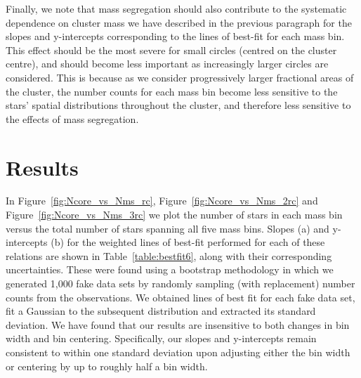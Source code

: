 Finally, we note that mass segregation
should also contribute to the systematic dependence on cluster mass we
have described in the previous paragraph for the slopes and
y-intercepts corresponding to the 
lines of best-fit for each mass bin.  This effect should be the most
severe for small circles (centred on the cluster centre), and should
become less important as increasingly larger circles are considered.
This is because as we consider progressively larger fractional areas
of the cluster, the number counts for each mass bin become less
sensitive to the stars' spatial distributions throughout the cluster,
and therefore less sensitive to the effects of mass segregation.

\section{Results} \label{results6}

In Figure~\ref{fig:Ncore_vs_Nms_rc}, Figure~\ref{fig:Ncore_vs_Nms_2rc}
and Figure~\ref{fig:Ncore_vs_Nms_3rc} we plot the number of
stars in each mass bin versus the total number of stars spanning all five
mass bins.  Slopes (a) and y-intercepts (b) for the weighted lines of best-fit
performed for each of these relations are shown in Table~\ref{table:bestfit6},
along with their corresponding uncertainties.  These were 
found using a bootstrap methodology in which we generated 1,000 fake
data sets by randomly sampling (with replacement) number counts from
the observations.  We obtained lines of best fit for each fake data
set, fit a Gaussian to the subsequent distribution and extracted its
standard deviation.  We have found that our results are insensitive to
both changes in bin width and bin centering.  Specifically, our slopes
and y-intercepts remain consistent to within one standard deviation
upon adjusting either the bin width or centering by up to roughly half
a bin width.

